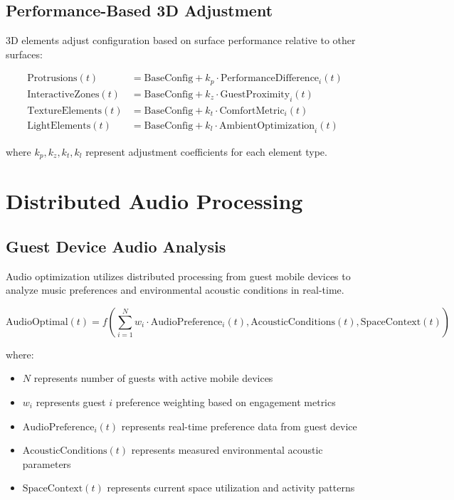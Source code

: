 \documentclass[12pt,a4paper]{article}
\begin{document}
\subsection{Performance-Based 3D Adjustment}

3D elements adjust configuration based on surface performance relative to other surfaces:

\begin{align}
\text{Protrusions}(t) &= \text{BaseConfig} + k_p \cdot \text{PerformanceDifference}_i(t) \\
\text{InteractiveZones}(t) &= \text{BaseConfig} + k_z \cdot \text{GuestProximity}_i(t) \\
\text{TextureElements}(t) &= \text{BaseConfig} + k_t \cdot \text{ComfortMetric}_i(t) \\
\text{LightElements}(t) &= \text{BaseConfig} + k_l \cdot \text{AmbientOptimization}_i(t)
\end{align}

where $k_p, k_z, k_t, k_l$ represent adjustment coefficients for each element type.

\section{Distributed Audio Processing}

\subsection{Guest Device Audio Analysis}

Audio optimization utilizes distributed processing from guest mobile devices to analyze music preferences and environmental acoustic conditions in real-time.

\begin{equation}
\text{AudioOptimal}(t) = f\left(\sum_{i=1}^{N} w_i \cdot \text{AudioPreference}_i(t), \text{AcousticConditions}(t), \text{SpaceContext}(t)\right)
\end{equation}

where:
\begin{itemize}
\item $N$ represents number of guests with active mobile devices
\item $w_i$ represents guest $i$ preference weighting based on engagement metrics
\item $\text{AudioPreference}_i(t)$ represents real-time preference data from guest device
\item $\text{AcousticConditions}(t)$ represents measured environmental acoustic parameters
\item $\text{SpaceContext}(t)$ represents current space utilization and activity patterns
\end{itemize}
\end{document}
